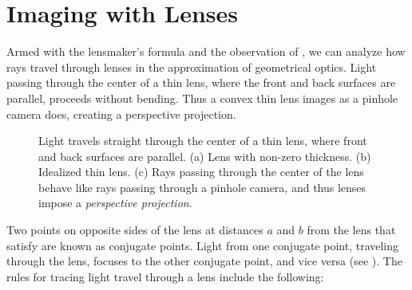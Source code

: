\section{Imaging with Lenses}
\label{sect:imagingWithLenses}

Armed with the lensmaker's formula and the observation of \fig{\ref{fig:thinLens}}, we can analyze how rays travel through lenses in the approximation of geometrical optics. Light passing through the center of a thin lens, where the front and back surfaces are parallel, proceeds without bending.  Thus a convex thin lens images as a pinhole camera does, creating a perspective projection.
\begin{figure}
\centerline{
}
\caption{Light travels straight through the center of a thin lens, where front and back surfaces are parallel.  (a) Lens with non-zero thickness.  (b) Idealized thin lens.  (c)  Rays passing through the center of the lens behave like rays passing through a pinhole camera, and thus lenses impose a {\em perspective projection}.}
\label{fig:thinLens}
\end{figure}

Two points on opposite sides of the lens at distances $a$ and $b$ from the lens that satisfy \eqn{\ref{eq:lensmaker}} are known as conjugate points.  Light from one conjugate point, traveling through the lens, focuses to the other conjugate point, and vice versa (see \fig{\ref{fig:lenspropt}}).
The rules for tracing light travel through a lens include the following:
  
